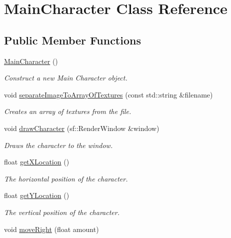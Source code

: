 \hypertarget{classMainCharacter}{}\section{Main\+Character Class Reference}
\label{classMainCharacter}
\subsection*{Public Member Functions}
\begin{DoxyCompactItemize}
\item 
\mbox{\hyperlink{classMainCharacter_a822c6796f6cac04dedfaa12846f1dd42}{Main\+Character}} ()
\begin{DoxyCompactList}\small\item\em Construct a new Main Character object. \end{DoxyCompactList}\item 
void \mbox{\hyperlink{classMainCharacter_accfd0235b5f57d38be77643e979c893d}{separate\+Image\+To\+Array\+Of\+Textures}} (const std\+::string \&filename)
\begin{DoxyCompactList}\small\item\em Creates an array of textures from the file. \end{DoxyCompactList}\item 
void \mbox{\hyperlink{classMainCharacter_a88c571025d325e44d349a1e899e8b22a}{draw\+Character}} (sf\+::\+Render\+Window \&window)
\begin{DoxyCompactList}\small\item\em Draws the character to the window. \end{DoxyCompactList}\item 
float \mbox{\hyperlink{classMainCharacter_a48c6e280e68d400e3eeac2f33fb194ff}{get\+X\+Location}} ()
\begin{DoxyCompactList}\small\item\em The horizontal position of the character. \end{DoxyCompactList}\item 
float \mbox{\hyperlink{classMainCharacter_aa802ffc7d85805d5dffc4d3700fcee7d}{get\+Y\+Location}} ()
\begin{DoxyCompactList}\small\item\em The vertical position of the character. \end{DoxyCompactList}\item 
void \mbox{\hyperlink{classMainCharacter_ab5a4b64dcc249e3208282797e523d813}{move\+Right}} (float amount)

\end{DoxyCompactItemize}
